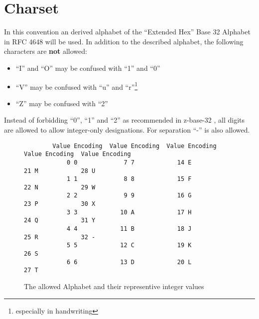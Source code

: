 %
%
%
%
%
%
%

\section{Charset}

In this convention an derived alphabet of the ``Extended Hex'' Base 32 Alphabet
in RFC 4648 \cite{RFC-4648} will be used. In addition to the described alphabet,
the following characters are \textbf{not} allowed:

\begin{itemize}
	\itemsep 0pt

	\item ``I'' and ``O'' may be confused with ``1'' and ``0''
	\item ``V'' may be confused with ``u'' and ``r''\footnote{\label{foot:handwriting}especially in handwriting}
	\item ``Z'' may be confused with ``2''
\end{itemize}

Instead of forbidding ``0'', ``1'' and ``2'' as recommended in z-base-32
\cite{z-base-32}, all digits are allowed to allow integer-only designations.
For separation ``-'' is also allowed.


\begin{figure}[H]
	\label{fig:charset}

	\begin{verbatim}
		Value Encoding  Value Encoding  Value Encoding  Value Encoding  Value Encoding
		    0 0             7 7            14 E            21 M            28 U
		    1 1             8 8            15 F            22 N            29 W
		    2 2             9 9            16 G            23 P            30 X
		    3 3            10 A            17 H            24 Q            31 Y
		    4 4            11 B            18 J            25 R            32 -
		    5 5            12 C            19 K            26 S
		    6 6            13 D            20 L            27 T
	\end{verbatim}

	\caption{The allowed Alphabet and their representive integer values}
\end{figure}


